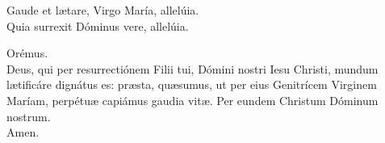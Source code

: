 \begin{multicols}{2}

\setlength{\parskip}{0.5em}
\V Gaude et lætare, Virgo María, allelúia.\\
\R Quia surrexit Dóminus vere, allelúia.

Orémus.\\
Deus, qui per resurrectiónem Filii tui, Dómini nostri Iesu Christi,
mundum lætificáre dignátus es:
præsta, quæsumus, ut per eius Genitrícem Virginem Maríam,
perpétuæ capiámus gaudia vitæ.
Per eundem Christum Dóminum nostrum.\\
\R Amen.
\setlength{\parskip}{0.5em}

\end{multicols}
